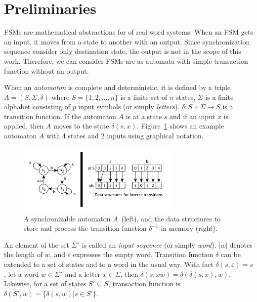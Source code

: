 \documentclass[12pt]{article}
\begin{document}
\clearpage
\section{Preliminaries}
\label{sec:Preliminaries}
FSMs are mathematical abstractions for of real word systems. When an FSM gets an input, it moves from a state to another with an output. Since synchronization sequence consider only destination state, the output is not in the scope of this work. Therefore, we can consider FSMs are as automata with simple transaction function without an output.

When an {\em automaton} is complete and deterministic, it is defined by a triple $A=(S, \Sigma, \delta)$  where $S = \{1, 2, \ldots, n\}$ is a finite set of $n$ states, $\Sigma$ is a finite alphabet consisting of $p$ input symbols (or simply {\em letters}). $\delta : S \times \Sigma \rightarrow S$ is a transition function. If the automaton $A$ is at a state $s$ and if an input $x$ is applied, then $A$ moves to the state $\delta(s,x)$. Figure~\ref{fig:inv} shows an example automaton $A$ with 4 states and 2 inputs using graphical notation.

\begin{figure}[h]
\centering
\includegraphics[width=0.7\textwidth]{figs/inverse.pdf}
\caption{A synchronizable automaton $A$~(left), and the data structures to store and process the transition function $\delta^{-1}$  in memory (right).}
\label{fig:inv}
\vspace*{-3ex}
\end{figure}

An element of the set $\Sigma^\star$ is called an {\em input sequence} (or simply {\em word}). $|w|$ denotes the length of $w$, and $\varepsilon$ expresses the empty word. Transition function $\delta$ can be extended to a set of states and to a word in the usual way. With fact $\delta(s,\varepsilon)=s$, let a word $w \in \Sigma^\star$ and a letter $x \in \Sigma$, then $\delta(s,xw) = \delta(\delta(s,x),w)$. Likewise, for a set of states $S' \subseteq S$, transaction function is $\delta(S',w) = \{ \delta(s,w) | s \in S'\}$.
\end{document}
